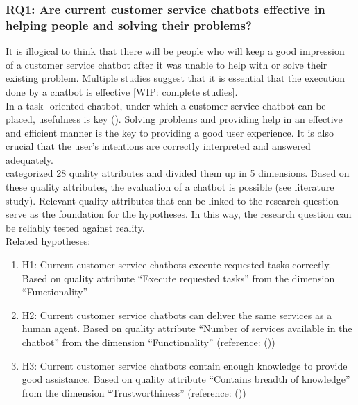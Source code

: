 \subsubsection{RQ1: Are current customer service chatbots effective in helping people and solving their problems?}
It is illogical to think that there will be people who will keep a good impression of a customer service chatbot after it was unable to help with or solve their existing problem. Multiple studies suggest that it is essential that the execution done by a chatbot is effective [WIP: complete studies].\\
In a task- oriented chatbot, under which a customer service chatbot can be placed, usefulness is key (\cite{brandtzaeg2020}). Solving problems and providing help in an effective and efficient manner is the key to providing a good user experience. It is also crucial that the user's intentions are correctly interpreted and answered adequately.\\
\break
\cite{Verkeyn2018} categorized 28 quality attributes and divided them up in 5 dimensions. Based on these quality attributes, the evaluation of a chatbot is possible (see literature study). Relevant quality attributes that can be linked to the research question serve as the foundation for the hypotheses. In this way, the research question can be reliably tested against reality.\\
\break
\break
Related hypotheses:
\begin{enumerate}
	\item H1: Current customer service chatbots execute requested tasks correctly. Based on \cite{Verkeyn2018} quality attribute “Execute requested tasks” from the dimension “Functionality”
	\item H2: Current customer service chatbots can deliver the same services as a human agent. Based on \cite{Verkeyn2018} quality attribute “Number of services available in the chatbot” from the dimension “Functionality” (reference: (\cite{Eeuwen2017}))
	\item H3: Current customer service chatbots contain enough knowledge to provide good assistance. Based on \cite{Verkeyn2018} quality attribute “Contains breadth of knowledge” from the dimension “Trustworthiness” (reference: (\cite{Cohen2016, Kuligowska2015}))
\end{enumerate}

